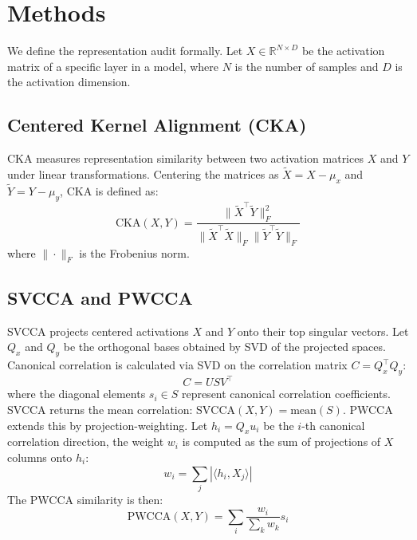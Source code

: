 \documentclass[twocolumn]{article}
\begin{document}
\section{Methods}
\label{sec:methods}
We define the representation audit formally. Let $X \in \mathbb{R}^{N \times D}$ be the activation matrix of a specific layer in a model, where $N$ is the number of samples and $D$ is the activation dimension.

\subsection{Centered Kernel Alignment (CKA)}
CKA measures representation similarity between two activation matrices $X$ and $Y$ under linear transformations. Centering the matrices as $\tilde{X} = X - \mu_x$ and $\tilde{Y} = Y - \mu_y$, CKA is defined as:
\begin{equation}
    \text{CKA}(X, Y) = \frac{\|\tilde{X}^\top \tilde{Y}\|_F^2}{\|\tilde{X}^\top \tilde{X}\|_F \|\tilde{Y}^\top \tilde{Y}\|_F}
\end{equation}
where $\|\cdot\|_F$ is the Frobenius norm.

\subsection{SVCCA and PWCCA}
SVCCA projects centered activations $X$ and $Y$ onto their top singular vectors. Let $Q_x$ and $Q_y$ be the orthogonal bases obtained by SVD of the projected spaces. Canonical correlation is calculated via SVD on the correlation matrix $C = Q_x^\top Q_y$:
\begin{equation}
    C = U S V^\top
\end{equation}
where the diagonal elements $s_i \in S$ represent canonical correlation coefficients. SVCCA returns the mean correlation: $\text{SVCCA}(X, Y) = \text{mean}(S)$.
PWCCA extends this by projection-weighting. Let $h_i = Q_x u_i$ be the $i$-th canonical correlation direction, the weight $w_i$ is computed as the sum of projections of $X$ columns onto $h_i$:
\begin{equation}
    w_i = \sum_{j} |\langle h_i, X_j \rangle|
\end{equation}
The PWCCA similarity is then:
\begin{equation}
    \text{PWCCA}(X, Y) = \sum_{i} \frac{w_i}{\sum_k w_k} s_i
\end{equation}
\end{document}
